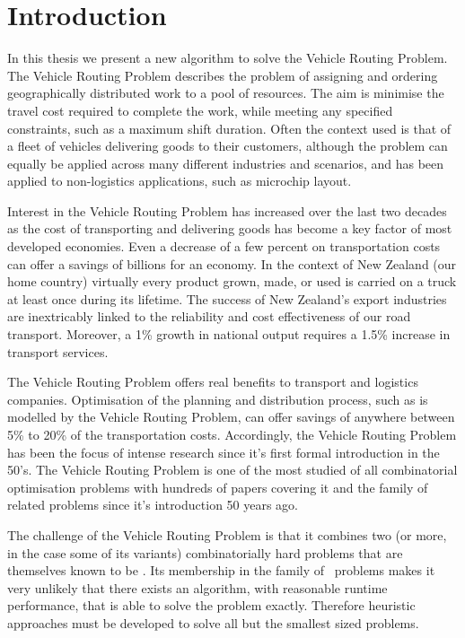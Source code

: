 
\chapter{Introduction}

In this thesis we present a new algorithm to solve the Vehicle Routing Problem. The Vehicle Routing Problem describes the problem of assigning and ordering geographically distributed work to a pool of resources. The aim is minimise the travel cost required to complete the work, while meeting any specified constraints, such as a maximum shift duration. Often the context used is that of a fleet of vehicles delivering goods to their customers, although the problem can equally be applied across many different industries and scenarios, and has been applied to non-logistics applications, such as microchip layout. 

Interest in the Vehicle Routing Problem has increased over the last two decades as the cost of transporting and delivering goods has become a key factor of most developed economies. Even a decrease of a few percent on transportation costs can offer a savings of billions for an economy. In the context of New Zealand (our home country) virtually every product grown, made, or used is carried on a truck at least once during its lifetime\cite{RTFNZ}. The success of New Zealand's export industries are inextricably linked to the reliability and cost effectiveness of our road transport. Moreover, a 1\% growth in national output requires a 1.5\% increase in transport services\cite{RTFNZ}. 

The Vehicle Routing Problem offers real benefits to transport and logistics companies. Optimisation of the planning and distribution process, such as is modelled by the Vehicle Routing Problem, can offer savings of anywhere between 5\% to 20\% of the transportation costs\cite{TV2001}. Accordingly, the Vehicle Routing Problem has been the focus of intense research since it's first formal introduction in the 50's. The Vehicle Routing Problem is one of the most studied of all combinatorial optimisation problems with hundreds of papers covering it and the family of related problems since it's introduction 50 years ago.

The challenge of the Vehicle Routing Problem is that it combines two (or more, in the case some of its variants) combinatorially hard problems that are themselves known to be \nphard. Its membership in the family of \nphard\ problems makes it very unlikely that there exists an algorithm, with reasonable runtime performance, that is able to solve the problem exactly. Therefore heuristic approaches must be developed to solve all but the smallest sized problems.


